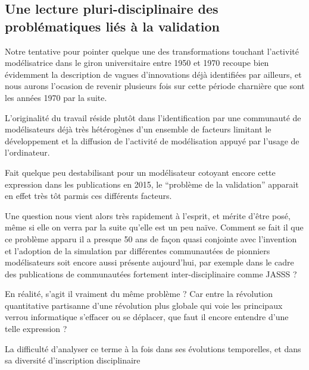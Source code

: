 

\subsection{Une lecture pluri-disciplinaire des problématiques liés à la validation}
\label{ssec:triple_lecture}



Notre tentative pour pointer quelque une des transformations touchant l'activité modélisatrice dans le giron universitaire entre 1950 et 1970 recoupe bien évidemment la description de vagues d'innovations déjà identifiées par ailleurs, et nous aurons l'ocasion de revenir plusieurs fois sur cette période charnière que sont les années 1970 par la suite. 

L'originalité du travail réside plutôt dans l'identification par une communauté de modélisateurs déjà très hétérogènes d'un ensemble de facteurs limitant le développement et la diffusion de l'activité de modélisation appuyé par l'usage de l'ordinateur. 

Fait quelque peu destabilisant pour un modélisateur cotoyant encore cette expression dans les publications en 2015, le \enquote{problème de la validation} apparait en effet très tôt parmis ces différents facteurs. 

Une question nous vient alors très rapidement à l'esprit, et mérite d'être posé, même si elle on verra par la suite qu'elle est un peu naïve. Comment se fait il que ce problème apparu il a presque 50 ans de façon quasi conjointe avec l'invention et l'adoption de la simulation par différentes communautées de pionniers modélisateurs soit encore aussi présente aujourd'hui, par exemple dans le cadre des publications de communautées fortement inter-disciplinaire comme JASSS ? 

En réalité, s'agit il vraiment du même problème ? Car entre la révolution quantitative partisanne d'une révolution plus globale qui voie les principaux verrou informatique s'effacer ou se déplacer, que faut il encore entendre d'une telle expression ? 

La difficulté d'analyser ce terme à la fois dans ses évolutions temporelles,  et dans sa diversité d'inscription disciplinaire 


